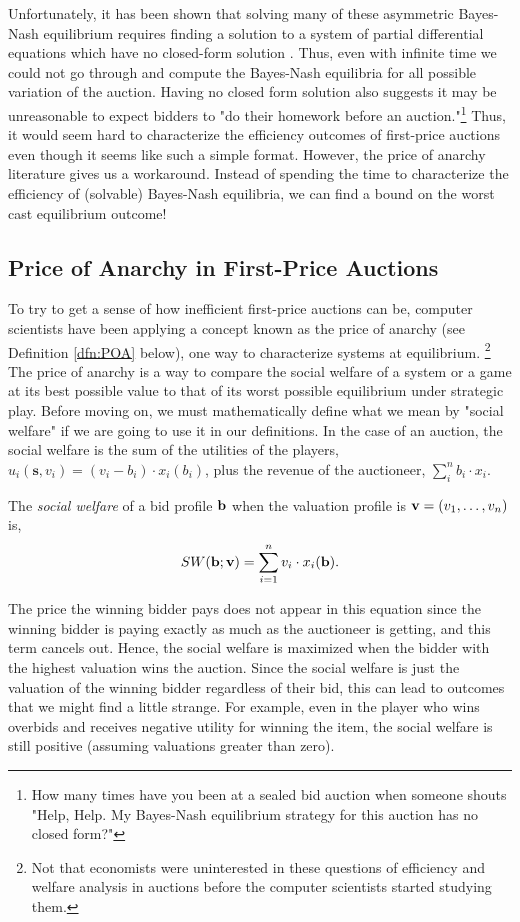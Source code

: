 \documentclass[12pt,twoside]{reedthesis}
\begin{document}
 Unfortunately, it has been shown that solving many of these asymmetric Bayes-Nash equilibrium requires finding a solution to a system of partial differential equations which have no closed-form solution \citep{Roughgarden2017}. Thus, even with infinite time we could not go through and compute the Bayes-Nash equilibria for all possible variation of the auction. Having no closed form solution also suggests it may be unreasonable to expect bidders to "do their homework before an auction."\footnote{How many times have you been at a sealed bid auction when someone shouts "Help, Help. My Bayes-Nash equilibrium strategy for this auction has no closed form?"} Thus, it would seem hard to characterize the efficiency outcomes of first-price auctions even though it seems like such a simple format. However, the price of anarchy literature gives us a workaround. Instead of spending the time to characterize the efficiency of (solvable) Bayes-Nash equilibria, we can find a bound on the worst cast equilibrium outcome!
\label{sec:knownBayes}
\subsection{Price of Anarchy in First-Price Auctions}  
To try to get a sense of how inefficient first-price auctions can be, computer scientists have been applying a concept known as the price of anarchy (see Definition \ref{dfn:POA} below), one way to characterize systems at equilibrium. \footnote{Not that economists were uninterested in these questions of efficiency and welfare analysis in auctions before the computer scientists started studying them.} The price of anarchy is a way to compare the social welfare of a system or a game at its best possible value to that of its worst possible equilibrium under strategic play. Before moving on, we must mathematically define what we mean by "social welfare" if we are going to use it in our definitions. In the case of an auction, the social welfare is the sum of the utilities of the players, $u_i(\textbf{s}, v_i) = (v_i - b_i) \cdot x_i(b_i)$, plus the revenue of the auctioneer, $\sum_{i}^{n} b_i \cdot x_i$. 

\begin{dfn}
	The \textit{social welfare} of a bid profile $\textbf{b}$ when the valuation profile is $\textbf{v} = (v_1, \ldots, v_n)$ is, 
	$$ SW(\textbf{b};\textbf{v}) = \sum_{i=1}^{n} v_i \cdot x_i (\textbf{b}).$$
	\label{dfn:SocialWelfare}
\end{dfn}

The price the winning bidder pays does not appear in this equation since the winning bidder is paying exactly as much as the auctioneer is getting, and this term cancels out. Hence, the social welfare is maximized when the bidder with the highest valuation wins the auction. Since the social welfare is just the valuation of the winning bidder regardless of their bid, this can lead to outcomes that we might find a little strange. For example, even in the player who wins overbids and receives negative utility for winning the item, the social welfare is still positive (assuming valuations greater than zero). 
\end{document}

